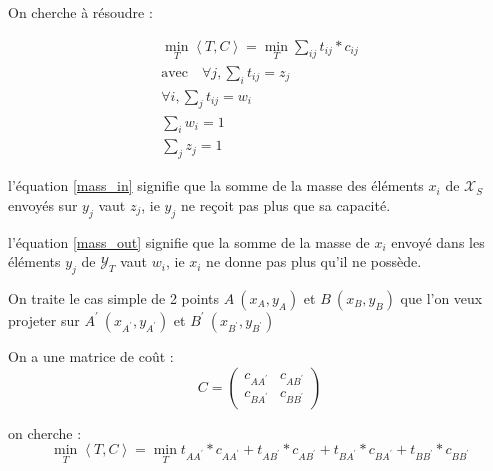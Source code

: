 On cherche à résoudre :

\begin{align}
\min_T \left<T,C\right> = \min_{T} \sum_{ij} t_{ij}*c_{ij}\\
\text{avec}\quad
\forall j, \sum_i t_{ij} = z_j 
\label{mass_in}\\
\forall i, \sum_j t_{ij} = w_i
\label{mass_out}\\
\sum_i w_i = 1
\label{mass_in_tot}\\
\sum_j z_j = 1  
\label{mass_out_tot}
\end{align}

l'équation \eqref{mass_in} signifie que la somme de la masse des éléments $x_i$ de $\mathcal{X}_S$
envoyés sur $y_j$ vaut $z_j$, ie $y_j$ ne reçoit pas plus que sa capacité.

l'équation \eqref{mass_out} signifie que la somme de la masse de $x_i$ envoyé dans les 
éléments $y_j$ de $\mathcal{Y}_T$ vaut $w_i$, ie $x_i$ ne donne pas plus qu'il ne possède.




On traite le cas simple de 2 points $A\ (x_A, y_A)$ et $B\ (x_B, y_B)$ 
que l'on veux projeter sur $A^\prime\ (x_{A^\prime}, y_{A^\prime})$ et $B^\prime\ (x_{B^\prime}, y_{B^\prime})$ 

On a une matrice de coût :
$$
C = 
\begin{pmatrix}
   c_{AA^\prime} & c_{AB^\prime} \\
   c_{BA^\prime} & c_{BB^\prime} 
\end{pmatrix}
$$

on cherche : 
\begin{equation}
\min_T \left<T,C\right> = \min_{T} 
t_{AA^\prime}*c_{AA^\prime} + 
t_{AB^\prime}*c_{AB^\prime} + 
t_{BA^\prime}*c_{BA^\prime} + 
t_{BB^\prime}*c_{BB^\prime}
\end{equation}

